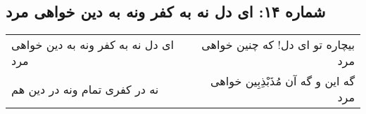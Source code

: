 \begin{center}
\section*{شماره ۱۴: ای دل نه به کفر ونه به دین خواهی مرد}
\label{sec:014}
\begin{longtable}{l p{0.5cm} r}
ای دل نه به کفر ونه به دین خواهی مرد
&&
بیچاره تو ای دل! که چنین خواهی مرد
\\
نه در کفری تمام ونه در دین هم
&&
گه این و گه آن مُذَبْذِبِین خواهی مرد
\\
\end{longtable}
\end{center}
